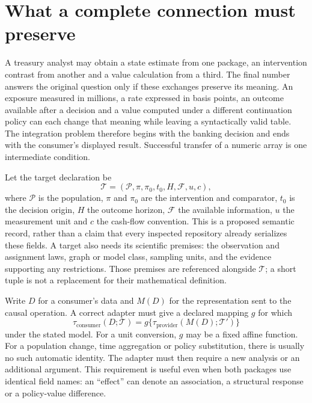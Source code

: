 \section{What a complete connection must preserve}

A treasury analyst may obtain a state estimate from one package, an intervention
contrast from another and a value calculation from a third. The final number
answers the original question only if these exchanges preserve its meaning.
An exposure measured in millions, a rate expressed in basis points, an outcome
available after a decision and a value computed under a different continuation
policy can each change that meaning while leaving a syntactically valid table.
The integration problem therefore begins with the banking decision and ends
with the consumer's displayed result. Successful transfer of a numeric array
is one intermediate condition.

Let the target declaration be
\[
 \mathcal T=(\mathcal P,\pi,\pi_0,t_0,H,\mathcal F,u,c),
\]
where $\mathcal P$ is the population, $\pi$ and $\pi_0$ are the intervention
and comparator, $t_0$ is the decision origin, $H$ the outcome horizon,
$\mathcal F$ the available information, $u$ the measurement unit and $c$ the
cash-flow convention. This is a proposed semantic record, rather than a claim
that every inspected repository already serializes these fields. A target also
needs its scientific premises: the observation and assignment laws, graph or
model class, sampling units, and the evidence supporting any restrictions.
Those premises are referenced alongside $\mathcal T$; a short tuple is not a
replacement for their mathematical definition.

Write $D$ for a consumer's data and $M(D)$ for the representation sent to the
causal operation. A correct adapter must give a declared mapping $g$ for which
\begin{equation}
 \tau_{\mathrm{consumer}}(D;\mathcal T)
   =g\{\tau_{\mathrm{provider}}(M(D);\mathcal T')\}
 \label{exec13:i3-target-map}
\end{equation}
under the stated model. For a unit conversion, $g$ may be a fixed affine
function. For a population change, time aggregation or policy substitution,
there is usually no such automatic identity. The adapter must then require a
new analysis or an additional argument. This requirement is useful even when
both packages use identical field names: an ``effect'' can denote an
association, a structural response or a policy-value difference.

